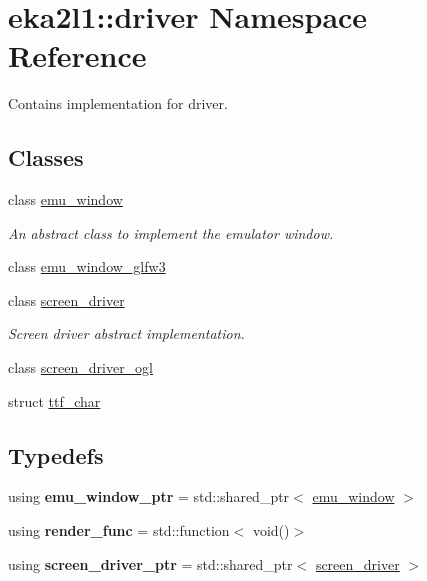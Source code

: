 \hypertarget{namespaceeka2l1_1_1driver}{}\section{eka2l1\+:\+:driver Namespace Reference}
\label{namespaceeka2l1_1_1driver}


Contains implementation for driver.  


\subsection*{Classes}
\begin{DoxyCompactItemize}
\item 
class \mbox{\hyperlink{classeka2l1_1_1driver_1_1emu__window}{emu\+\_\+window}}
\begin{DoxyCompactList}\small\item\em An abstract class to implement the emulator window. \end{DoxyCompactList}\item 
class \mbox{\hyperlink{classeka2l1_1_1driver_1_1emu__window__glfw3}{emu\+\_\+window\+\_\+glfw3}}
\item 
class \mbox{\hyperlink{classeka2l1_1_1driver_1_1screen__driver}{screen\+\_\+driver}}
\begin{DoxyCompactList}\small\item\em Screen driver abstract implementation. \end{DoxyCompactList}\item 
class \mbox{\hyperlink{classeka2l1_1_1driver_1_1screen__driver__ogl}{screen\+\_\+driver\+\_\+ogl}}
\item 
struct \mbox{\hyperlink{structeka2l1_1_1driver_1_1ttf__char}{ttf\+\_\+char}}
\end{DoxyCompactItemize}
\subsection*{Typedefs}
\begin{DoxyCompactItemize}
\item 
\mbox{\label{namespaceeka2l1_1_1driver_a4c06594db8678b06882b4c2152673a2a}} 
using {\bfseries emu\+\_\+window\+\_\+ptr} = std\+::shared\+\_\+ptr$<$ \mbox{\hyperlink{classeka2l1_1_1driver_1_1emu__window}{emu\+\_\+window}} $>$
\item 
\mbox{\label{namespaceeka2l1_1_1driver_a12f6cced4921ca24ba98feb9f19cdf6c}} 
using {\bfseries render\+\_\+func} = std\+::function$<$ void()$>$
\item 
\mbox{\label{namespaceeka2l1_1_1driver_afda572e38db56d17f0eab99160f8974e}} 
using {\bfseries screen\+\_\+driver\+\_\+ptr} = std\+::shared\+\_\+ptr$<$ \mbox{\hyperlink{classeka2l1_1_1driver_1_1screen__driver}{screen\+\_\+driver}} $>$
\end{DoxyCompactItemize}
